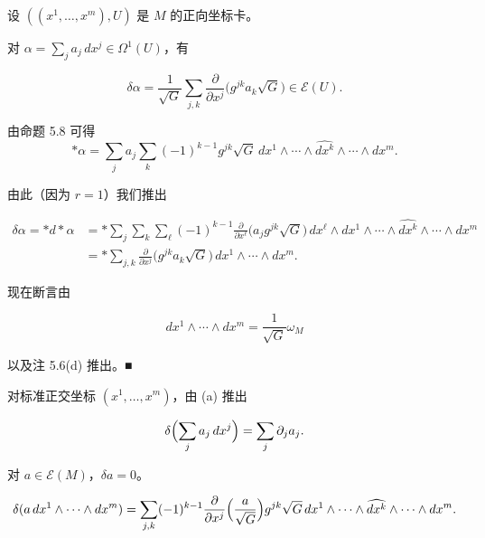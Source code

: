 \begin{example}

设 $ ((x^{1},\ldots,x^{m}),U) $ 是 $ M $ 的正向坐标卡。

\begin{items}
\item

对 $ \alpha = \sum_{j} a_{j}\,dx^{j} \in \Omega^{1}(U) $，有

\[
\delta\alpha = \frac{1}{\sqrt{G}}\sum_{j,k}\frac{\partial}{\partial x^{j}}\bigl(g^{jk}a_{k}\sqrt{G}\bigr) \in \mathcal{E}(U) .
\]

\proofhead
由命题 5.8 可得
\[
\ast\alpha = \sum_{j} a_{j}\sum_{k}(-1)^{k-1}g^{jk}\sqrt{G}\,dx^{1} \wedge \cdots \wedge \widehat{dx^{k}} \wedge \cdots \wedge dx^{m} .
\]

由此（因为 $ r = 1 $）我们推出

\begin{equation*}
\begin{aligned}
\delta\alpha = \ast d\ast\alpha &= \ast\sum_{j}\sum_{k}\sum_{\ell}(-1)^{k-1}\frac{\partial}{\partial x^{\ell}}\bigl(a_{j}g^{jk}\sqrt{G}\bigr)\,dx^{\ell} \wedge dx^{1} \wedge \cdots \wedge \widehat{dx^{k}} \wedge \cdots \wedge dx^{m} \\ &= \ast\sum_{j,k}\frac{\partial}{\partial x^{j}}\bigl(g^{jk}a_{k}\sqrt{G}\bigr)\,dx^{1} \wedge \cdots \wedge dx^{m} .
\end{aligned}
\end{equation*}

现在断言由

\begin{equation}
dx^{1} \wedge \cdots \wedge dx^{m} = \frac{1}{\sqrt{G}}\omega_{M}\tag{5.25}
\end{equation}

以及注 5.6(d) 推出。\nobreak\hspace{0.35em}■

\item

对标准正交坐标 $ (x^{1},\ldots,x^{m}) $，由 (a) 推出

\[
\delta\Bigl(\sum_{j}a_{j}\,dx^{j}\Bigr) = \sum_{j}\partial_{j}a_{j} .
\]
\item

对 $ a \in \mathcal{E}(M) $，$ \delta a = 0 $。

\item
\[
\delta(a\,dx^{1} \wedge \cdots \wedge dx^{m}) = \sum_{j,k}(-1)^{k-1}\frac{\partial}{\partial x^{j}}\Bigl(\frac{a}{\sqrt{G}}\Bigr)g^{jk}\sqrt{G}\,dx^{1} \wedge \cdots \wedge \widehat{dx^{k}} \wedge \cdots \wedge dx^{m} .
\]


\end{items}
\end{example}
